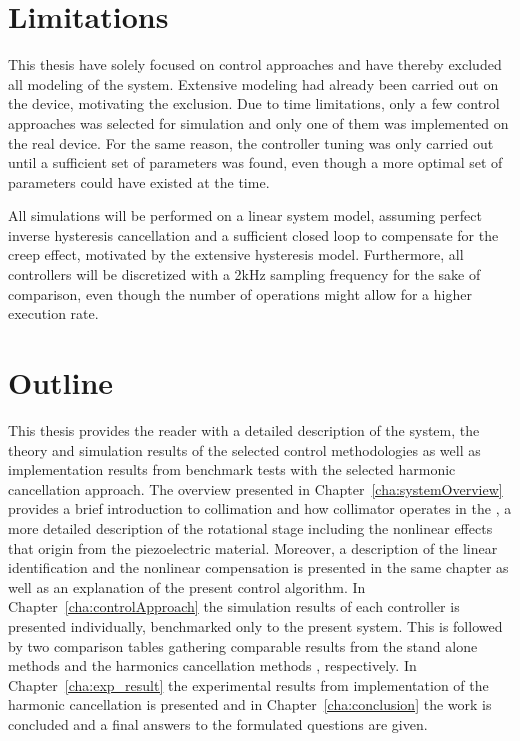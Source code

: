\section{Limitations}
This thesis have solely focused on control approaches and have thereby excluded all modeling of the system. Extensive modeling had already been carried out on the device, motivating the exclusion. Due to time limitations, only a few control approaches was selected for simulation and only one of them was implemented on the real device. For the same reason, the controller tuning was only carried out until a sufficient set of parameters was found, even though a more optimal set of parameters could have existed at the time.

All simulations will be performed on a linear system model, assuming perfect inverse hysteresis cancellation and a sufficient closed loop to compensate for the creep effect, motivated by the extensive hysteresis model. Furthermore, all controllers will be discretized with a 2kHz sampling frequency for the sake of comparison, even though the number of operations might allow for a higher execution rate.

\section{Outline}
This thesis provides the reader with a detailed description of the system, the theory and simulation results of the selected control methodologies as well as implementation results from benchmark tests with the selected harmonic cancellation approach. The overview presented in Chapter~\ref{cha:systemOverview} provides a brief introduction to collimation and how collimator operates in the \abbrLHC, a more detailed description of the rotational stage including the nonlinear effects that origin from the piezoelectric material. Moreover, a description of the linear identification and the nonlinear compensation is presented in the same chapter as well as an explanation of the present control algorithm. In Chapter~\ref{cha:controlApproach} the simulation results of each controller is presented individually, benchmarked only to the present system. This is followed by two comparison tables gathering comparable results from the stand alone methods and the harmonics cancellation methods , respectively. In Chapter~\ref{cha:exp_result} the experimental results from implementation of the harmonic cancellation is presented and in Chapter~\ref{cha:conclusion} the work is concluded and a final answers to the formulated questions are given.
